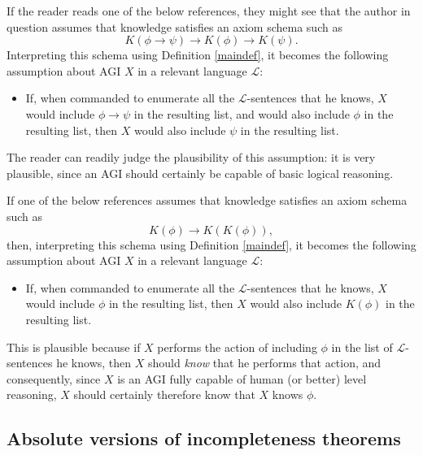 \documentclass[runningheads]{llncs}
\begin{document}
\begin{example}
If the reader
reads one of the below references, they might see that the author in question
assumes that knowledge satisfies an axiom schema such as
\[K(\phi\rightarrow\psi)\rightarrow K(\phi)\rightarrow K(\psi).\]
Interpreting this schema using Definition \ref{maindef}, it becomes the following
assumption about AGI $X$ in a relevant language $\mathscr L$:
\begin{itemize}
  \item
  If, when commanded to enumerate all the $\mathscr L$-sentences that he knows,
  $X$ would include $\phi\rightarrow\psi$ in the resulting list, and would also
  include $\phi$ in the resulting list, then $X$ would also include $\psi$ in
  the resulting list.
\end{itemize}
The reader can readily judge the plausibility of this assumption: it is very plausible,
since an AGI should certainly be capable of basic logical reasoning.
\end{example}

\begin{example}
  If one of the below references assumes that knowledge satisfies an axiom schema
  such as
  \[
    K(\phi)\rightarrow K(K(\phi)),
  \]
  then, interpreting this schema using Definition \ref{maindef}, it becomes
  the following assumption about AGI $X$ in a relevant language $\mathscr L$:
  \begin{itemize}
    \item
    If, when commanded to enumerate all the $\mathscr L$-sentences that he knows,
    $X$ would include $\phi$ in the resulting list, then $X$ would also include
    $K(\phi)$ in the resulting list.
  \end{itemize}
  This is plausible because if $X$ performs the action of including $\phi$ in the
  list of $\mathscr L$-sentences he knows, then $X$ should \emph{know} that he
  performs that action, and consequently, since $X$ is an AGI fully capable of
  human (or better) level reasoning, $X$ should certainly therefore know that $X$
  knows $\phi$.
\end{example}

\subsection{Absolute versions of incompleteness theorems}
\end{document}
